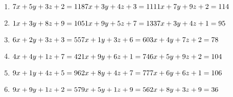 \documentclass{article}%
\begin{document}
\begin{enumerate}[label=\alph*)]
\item%
\newline\vspace{0.5cm} $7x+5y+3z+2=118\newline7x+3y+4z+3=111\newline1x+7y+9z+2=114\newline$%
\item%
\newline\vspace{0.5cm} $1x+3y+8z+9=105\newline1x+9y+5z+7=133\newline7x+3y+4z+1=95\newline$%
\item%
\newline\vspace{0.5cm} $6x+2y+3z+3=55\newline7x+1y+3z+6=60\newline3x+4y+7z+2=78\newline$%
\item%
\newline\vspace{0.5cm} $4x+4y+1z+7=42\newline1x+9y+6z+1=74\newline6x+5y+9z+2=104\newline$%
\item%
\newline\vspace{0.5cm} $9x+1y+4z+5=96\newline2x+8y+4z+7=77\newline7x+6y+6z+1=106\newline$%
\item%
\newline\vspace{0.5cm} $9x+9y+1z+2=57\newline9x+5y+1z+9=56\newline2x+8y+3z+9=36\newline$%
\end{enumerate}

%
\end{document}
